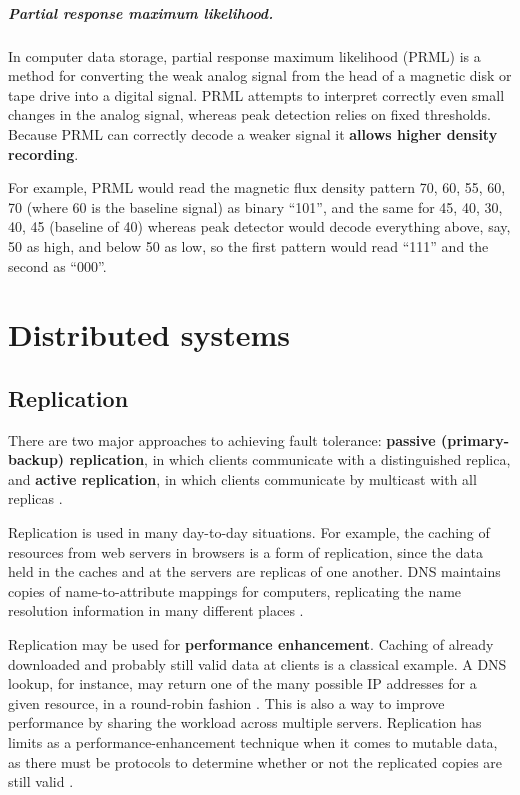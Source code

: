 \documentclass[12pt, oneside]{book}
\begin{document}
\paragraph{Partial response maximum likelihood.} In computer data storage,
partial response maximum likelihood (PRML) is a method for converting the weak
analog signal from the head of a magnetic disk or tape drive into a digital
signal. PRML attempts to interpret correctly even small changes in the analog
signal, whereas peak detection relies on fixed thresholds. Because PRML can
correctly decode a weaker signal it \textbf{allows higher density recording}.

For example, PRML would read the magnetic flux density pattern 70, 60, 55, 60,
70 (where 60 is the baseline signal) as binary ``101'', and the same for 45, 40,
30, 40, 45 (baseline of 40) whereas peak detector would decode everything
above, say, 50 as high, and below 50 as low, so the first pattern would read
``111'' and the second as ``000''.

\chapter{Distributed systems}

\section{Replication}

There are two major approaches to achieving fault tolerance: \textbf{passive (primary-backup) replication}, in which clients communicate with a distinguished replica, and \textbf{active replication}, in which clients communicate by multicast with all replicas \cite[p.~766]{distributed-systems-coulouris-2013}.

Replication is used in many day-to-day situations.
For example, the caching of resources from web servers in browsers is a form of replication, since the data held in the caches and at the servers are replicas of one another.
DNS maintains copies of name-to-attribute mappings for computers, replicating the name resolution information in many different places \cite[p.~766]{distributed-systems-coulouris-2013}.

Replication may be used for \textbf{performance enhancement}. Caching of already downloaded and probably still valid data at clients is a classical example. A DNS lookup, for instance, may return one of the many possible IP addresses for a given resource, in a round-robin fashion \cite[p.~766]{distributed-systems-coulouris-2013}. This is also a way to improve performance by sharing the workload across multiple servers.
Replication has limits as a performance-enhancement technique when it comes to mutable data, as there must be protocols to determine whether or not the replicated copies are still valid \cite[p.~766]{distributed-systems-coulouris-2013}.
\end{document}
